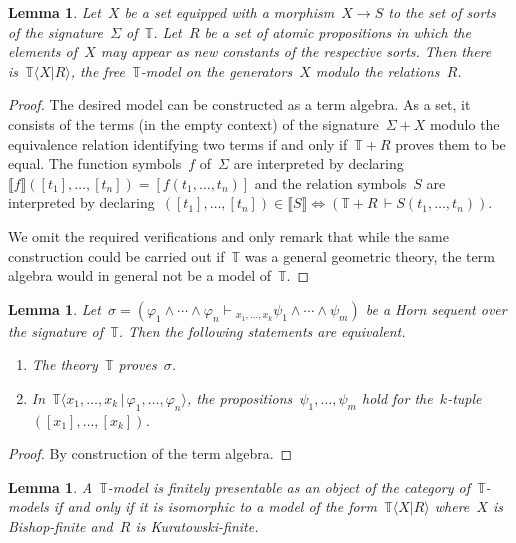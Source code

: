 \documentclass[oneside,reqno]{amsart}
\theoremstyle{definition}
\theoremstyle{plain}
\newtheorem{lemma}[defn]{Lemma}
\theoremstyle{remark}
\newcommand{\TT}{\mathbb{T}}
\renewcommand{\_}{\mathpunct{.}\,}
\newcommand{\?}{\,{:}\,}
\newcommand{\brak}[1]{\llbracket #1 \rrbracket}
\newcommand{\seq}[1]{\mathrel{\vdash\!\!\!_{#1}}}
\begin{document}

\begin{lemma}\label{lemma:free-models}
Let~$X$ be a set equipped with a morphism~$X \to S$ to the set of sorts
of the signature~$\Sigma$ of~$\TT$. Let~$R$ be a set of atomic propositions in which the
elements of~$X$ may appear as new constants of the respective sorts. Then there
is~$\TT\langle X | R \rangle$, the free~$\TT$-model on the generators~$X$ modulo
the relations~$R$.\end{lemma}

\begin{proof}The desired model can be constructed as a term algebra. As a set,
it consists of the terms (in the empty context) of the signature~$\Sigma + X$
modulo the equivalence relation identifying two terms if and only if~$\TT + R$
proves them to be equal. The function symbols~$f$ of~$\Sigma$ are interpreted
by declaring~$\brak{f}([t_1],\ldots,[t_n]) = [f(t_1,\ldots,t_n)]$ and the
relation symbols~$S$ are interpreted by declaring~$([t_1],\ldots,[t_n]) \in
\brak{S} \Leftrightarrow (\TT + R \,\vdash S(t_1,\ldots,t_n))$.

We omit the required verifications and only remark that while the same
construction could be carried out if~$\TT$ was a general geometric theory, the
term algebra would in general not be a model of~$\TT$.
\end{proof}

\begin{lemma}Let~$\sigma = (\varphi_1 \wedge \cdots \wedge \varphi_n
\seq{x_1,\ldots,x_k} \psi_1 \wedge \cdots \wedge \psi_m)$ be a Horn sequent
over the signature of~$\TT$. Then the following statements are equivalent.
\begin{enumerate}
\item The theory~$\TT$ proves~$\sigma$. \smallskip
\item In~$\TT\langle x_1,\ldots,x_k \,|\, \varphi_1,\ldots,\varphi_n \rangle$, the
propositions~$\psi_1,\ldots,\psi_m$ hold for
the~$k$-tuple~$([x_1],\ldots,[x_k])$.
\end{enumerate}
\end{lemma}

\begin{proof}By construction of the term algebra.\end{proof}

\begin{lemma}\label{lemma:char-fp-models}
A~$\TT$-model is finitely presentable as an object of the category
of~$\TT$-models if and only if it is isomorphic to a model of the
form~$\TT\langle X | R \rangle$ where~$X$ is Bishop-finite and~$R$ is
Kuratowski-finite.
\end{lemma}
\end{document}
